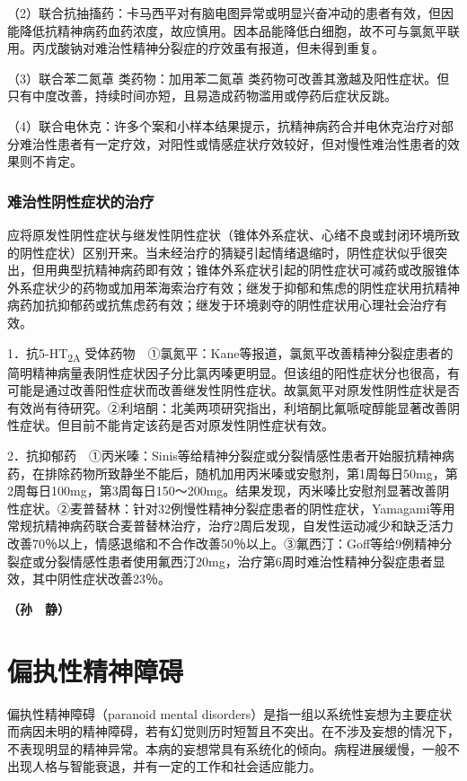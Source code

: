 （2）联合抗抽搐药：卡马西平对有脑电图异常或明显兴奋冲动的患者有效，但因能降低抗精神病药血药浓度，故应慎用。因本品能降低白细胞，故不可与氯氮平联用。丙戊酸钠对难治性精神分裂症的疗效虽有报道，但未得到重复。

（3）联合苯二氮䓬
类药物：加用苯二氮䓬
类药物可改善其激越及阳性症状。但只有中度改善，持续时间亦短，且易造成药物滥用或停药后症状反跳。

（4）联合电休克：许多个案和小样本结果提示，抗精神病药合并电休克治疗对部分难治性患者有一定疗效，对阳性或情感症状疗效较好，但对慢性难治性患者的效果则不肯定。

\subsubsection{难治性阴性症状的治疗}

应将原发性阴性症状与继发性阴性症状（锥体外系症状、心绪不良或封闭环境所致的阴性症状）区别开来。当未经治疗的猜疑引起情绪退缩时，阴性症状似乎很突出，但用典型抗精神病药即有效；锥体外系症状引起的阴性症状可减药或改服锥体外系症状少的药物或加用苯海索治疗有效；继发于抑郁和焦虑的阴性症状用抗精神病药加抗抑郁药或抗焦虑药有效；继发于环境剥夺的阴性症状用心理社会治疗有效。

1．抗5-HT\textsubscript{2A}
受体药物　①氯氮平：Kane等报道，氯氮平改善精神分裂症患者的简明精神病量表阴性症状因子分比氯丙嗪更明显。但该组的阳性症状分也很高，有可能是通过改善阳性症状而改善继发性阴性症状。故氯氮平对原发性阴性症状是否有效尚有待研究。②利培酮：北美两项研究指出，利培酮比氟哌啶醇能显著改善阴性症状。但目前不能肯定该药是否对原发性阴性症状有效。

2．抗抑郁药　①丙米嗪：Sinis等给精神分裂症或分裂情感性患者开始服抗精神病药，在排除药物所致静坐不能后，随机加用丙米嗪或安慰剂，第1周每日50mg，第2周每日100mg，第3周每日150～200mg。结果发现，丙米嗪比安慰剂显著改善阴性症状。②麦普替林：针对32例慢性精神分裂症患者的阴性症状，Yamagami等用常规抗精神病药联合麦普替林治疗，治疗2周后发现，自发性运动减少和缺乏活力改善70％以上，情感退缩和不合作改善50％以上。③氟西汀：Goff等给9例精神分裂症或分裂情感性患者使用氟西汀20mg，治疗第6周时难治性精神分裂症患者显效，其中阴性症状改善23％。

\textbf{（孙　静）}

\section{偏执性精神障碍}

偏执性精神障碍（paranoid mental
disorders）是指一组以系统性妄想为主要症状而病因未明的精神障碍，若有幻觉则历时短暂且不突出。在不涉及妄想的情况下，不表现明显的精神异常。本病的妄想常具有系统化的倾向。病程进展缓慢，一般不出现人格与智能衰退，并有一定的工作和社会适应能力。

